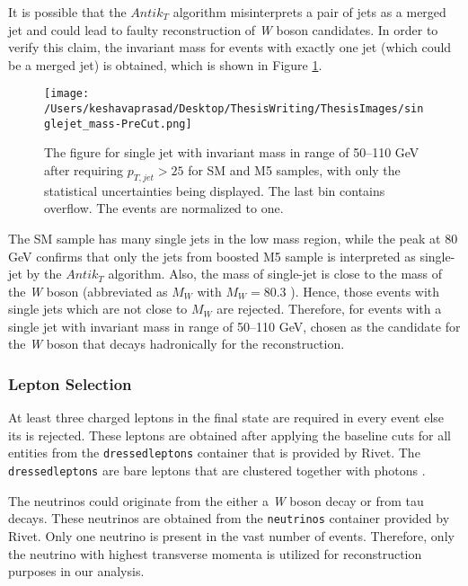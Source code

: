 It is possible that the $Antik_{T}$ algorithm misinterprets a pair of jets as a  merged jet and could lead to faulty reconstruction of \textit{W} boson candidates. In order to verify this claim, the invariant mass for events with exactly one jet (which could be a merged jet) is obtained, which is shown in Figure \ref{Single Jet Mass-PreCut}.

 \begin{figure}[!h]
 	\centering
 	\texttt{[image: /Users/keshavaprasad/Desktop/ThesisWriting/ThesisImages/singlejet\_mass-PreCut.png]}
 	\caption{The figure for single jet with invariant mass in range of \numrange[range-phrase = --]{50}{110} GeV after requiring $p_{T,jet}>25$  for SM and M5 samples, with only the statistical uncertainties being displayed. The last bin contains overflow. The events are normalized to one.}
 	\label{Single Jet Mass-PreCut}
 \end{figure}

 The SM sample has many single jets in the low mass region, while the peak at 80 GeV confirms that only the jets from boosted M5 sample is interpreted as single-jet by the $Antik_{T}$ algorithm. Also, the mass of single-jet is close to the mass of the \textit{W} boson (abbreviated as \texttt{$M_{W}$} with \texttt{$M_{W}=80.3$} \cite{pdg2010}). Hence, those events with single jets which are not close to \texttt{$M_{W}$} are rejected. Therefore, for events with a single jet with invariant mass in range of \numrange[range-phrase = --]{50}{110} GeV, chosen as the candidate for the \textit{W} boson that decays hadronically for the reconstruction.

\subsubsection{Lepton Selection}
At least three charged leptons in the final state are required in every event else its is rejected. These leptons are obtained after applying the baseline cuts for all entities from the \texttt{dressedleptons} container that is provided by Rivet. The \texttt{dressedleptons} are bare leptons that are clustered together with photons \cite{DressedLeptons}.

The neutrinos could originate from the either a \textit{W} boson decay or from tau decays. These neutrinos are obtained from the \texttt{neutrinos} container provided by Rivet. Only one neutrino is present in the vast number of events. Therefore, only the neutrino with highest transverse momenta is utilized for reconstruction purposes in our analysis.

